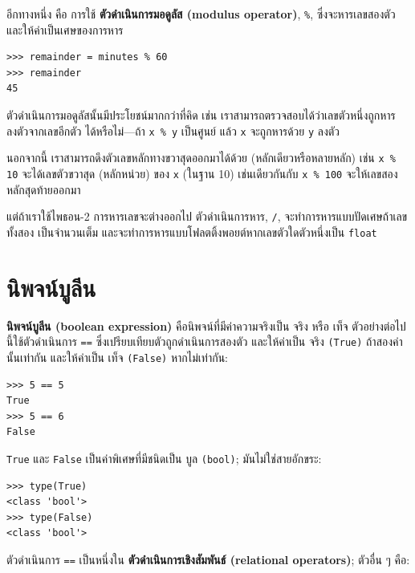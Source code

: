 อีกทางหนึ่ง คือ การใช้ {\bf ตัวดำเนินการมอดูลัส (modulus operator)}, \verb"%", ซึ่งจะหารเลขสองตัว
และให้ค่าเป็นเศษของการหาร

\begin{verbatim}
>>> remainder = minutes % 60
>>> remainder
45
\end{verbatim}
%
ตัวดำเนินการมอดูลัสนั้นมีประโยชน์มากกว่าที่คิด เช่น เราสามารถตรวจสอบได้ว่าเลขตัวหนึ่งถูกหารลงตัวจากเลขอีกตัว
ได้หรือไม่---ถ้า {\tt x \% y} เป็นศูนย์ แล้ว {\tt x} จะถูกหารด้วย {\tt y} ลงตัว

นอกจากนี้ เราสามารถดึงตัวเลขหลักทางขวาสุดออกมาได้ด้วย (หลักเดียวหรือหลายหลัก) เช่น {\tt x \% 10} 
จะได้เลขตัวขวาสุด (หลักหน่วย) ของ {\tt x} (ในฐาน 10) เช่นเดียวกันกับ {\tt x \% 100} จะให้เลขสองหลักสุดท้ายออกมา

แต่ถ้าเราใช้ไพธอน-2 การหารเลขจะต่างออกไป ตัวดำเนินการหาร, \verb"/", จะทำการหารแบบปัดเศษถ้าเลขทั้งสอง
เป็นจำนวนเต็ม และจะทำการหารแบบโฟลตติ้งพอยต์หากเลขตัวใดตัวหนึ่งเป็น {\tt float}



\section{นิพจน์บูลีน} %

{\bf นิพจน์บูลีน (boolean expression)} คือนิพจน์ที่มีค่าความจริงเป็น จริง หรือ เท็จ ตัวอย่างต่อไปนี้ใช้ตัวดำเนินการ 
{\tt ==} ซึ่งเปรียบเทียบตัวถูกดำเนินการสองตัว และให้ค่าเป็น จริง {\tt (True)} ถ้าสองค่านั้นเท่ากัน และให้ค่าเป็น
เท็จ {\tt (False)} หากไม่เท่ากัน:  

\begin{verbatim}
>>> 5 == 5
True
>>> 5 == 6
False
\end{verbatim}
%
{\tt True} และ {\tt False} เป็นค่าพิเศษที่มีชนิดเป็น บูล {\tt (bool)}; มันไม่ใช่สายอักขระ:

\begin{verbatim}
>>> type(True)
<class 'bool'>
>>> type(False)
<class 'bool'>
\end{verbatim}
%
ตัวดำเนินการ {\tt ==} เป็นหนึ่งใน {\bf ตัวดำเนินการเชิงสัมพันธ์ (relational operators)}; ตัวอื่น ๆ คือ:

